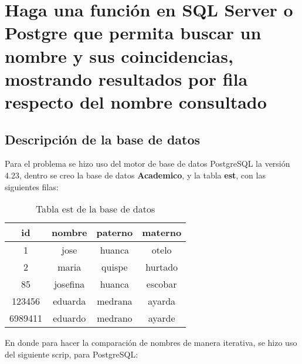 
\section{\fontsize{14}{0}\selectfont Haga una función en SQL Server o Postgre que permita buscar un nombre y sus coincidencias, mostrando resultados por fila respecto del nombre consultado}
\subsection{ Descripción de la base de datos}
Para el problema se hizo uso del motor de base de datos PostgreSQL la versión 4.23, dentro se creo la base de datos \textbf{Academico}, y la tabla \textbf{est}, con las siguientes filas:
\begin{table}[H]
	\centering
	\begin{tabular}{|c|c|c|c|}
		\hline
		id&nombre & paterno &materno\\
		\hline
		1&jose&huanca&otelo\\
		\hline
		2&maria&quispe&hurtado\\
		\hline
		85&josefina&huanca&escobar\\
		\hline
		123456&eduarda&medrana&ayarda\\
		\hline
		6989411&eduardo&medrano&ayarde\\
		\hline				
		
	\end{tabular}
	\caption[Tabla est de la base de datos]{Tabla est de la base de datos}

\end{table}

En donde para hacer la comparación de nombres de manera iterativa, se hizo uso del siguiente scrip, para PostgreSQL:

